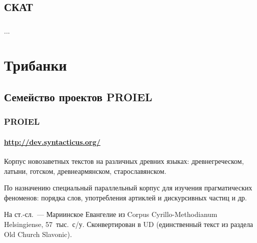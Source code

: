 \subsection{СКАТ}

\begin{frame}
  \frametitle{}

  ...

\end{frame}

\section{Трибанки}

\subsection{Семейство проектов PROIEL}

\begin{frame}
  \frametitle{PROIEL}
  \framesubtitle{\url{http://dev.syntacticus.org/}}

  Корпус новозаветных текстов на различных древних языках: древнегреческом, латыни, готском, древнеармянском, старославянском. \linebreak

  По назначению специальный параллельный корпус для изучения прагматических феноменов: порядка слов, употребления артиклей и дискурсивных частиц и др. \linebreak

  На ст.-сл.~--- Мариинское Евангелие из Corpus Cyrillo-Methodianum Helsingiense, 57~тыс.\ с/у. Сконвертирован в UD (единственный текст из раздела Old Church Slavonic).

\end{frame}

